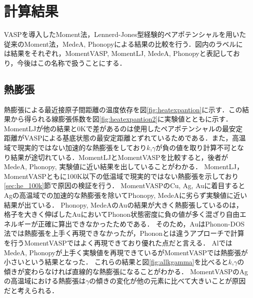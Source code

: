 \chapter{計算結果}
VASPを導入したMoment法，Lennerd-Jones型経験的ペアポテンシャルを用いた従来のMoment法，MedeA, Phonopyによる結果の比較を行う．図内のラベルには結果をそれぞれ，MomentVASP, MomentLJ, MedeA, Phonopyと表記しており，今後はこの名称で扱うことにする．
\section{熱膨張}
熱膨張による最近接原子間距離の温度依存を図\ref{fig:heatexpantion}に示す．この結果から得られる線膨張係数を図\ref{fig:heatexpantion2}に実験値とともに示す．
MomentLJが他の結果と0Kで差があるのは使用したペアポテンシャルの最安定距離がVASPによる基底状態の最安定距離とずれているためである．また，高温域で現実的ではない加速的な熱膨張をしており$k$,$\gamma$が負の値を取り計算不可となり結果が途切れている．MomentLJとMomentVASPを比較すると，後者がMedeA, Phonopy, 実験値に近い結果を出していることがわかる．
MomentLJ，MomentVASPともに100K以下の低温域で現実的ではない熱膨張を示しており\ref{sec:he_100k}節で原因の検証を行う．
MomentVASPのCu, Ag, Auに着目するとAgの高温域での加速的な熱膨張を除いてPhonopy, MedeAに劣らず実験値に近い結果が出ている．
Phonopy, MedeAのAuの結果が大きく熱膨張しているのは，格子を大きく伸ばしたAuにおいてPhonon状態密度に負の値が多く混ざり自由エネルギーが正確に算出できなかったためである．
そのため，AuはPhonon-DOS法では熱膨張を上手く再現できなかったが，Phononとは違うアプローチで計算を行うMomentVASPではよく再現できており優れた点だと言える．
AlではMedeA, Phonopyが上手く実験値を再現できているがMomentVASPでは熱膨張が小さいという結果となった．
これらの結果と図\ref{fig:allkgamma}を比べると$k$,$\gamma$の傾きが変わらなければ直線的な熱膨張になることがわかる．
MomentVASPのAgの高温域における熱膨張は$\gamma$の傾きの変化が他の元素に比べて大きいことが原因だと考えられる．
